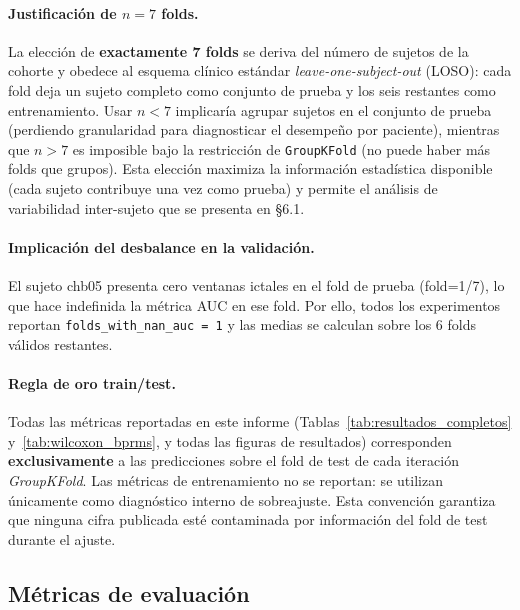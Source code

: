 \documentclass[12pt,a4paper]{article}
\begin{document}
\paragraph{Justificación de $n=7$ folds.}
La elección de \textbf{exactamente 7 folds} se deriva del número de sujetos de la cohorte
y obedece al esquema clínico estándar \textit{leave-one-subject-out} (LOSO): cada fold
deja un sujeto completo como conjunto de prueba y los seis restantes como entrenamiento.
Usar $n<7$ implicaría agrupar sujetos en el conjunto de prueba (perdiendo granularidad
para diagnosticar el desempeño por paciente), mientras que $n>7$ es imposible bajo la
restricción de \texttt{GroupKFold} (no puede haber más folds que grupos). Esta elección
maximiza la información estadística disponible (cada sujeto contribuye una vez como
prueba) y permite el análisis de variabilidad inter-sujeto que se presenta en §6.1.

\paragraph{Implicación del desbalance en la validación.}
El sujeto chb05 presenta cero ventanas ictales en el fold de prueba (fold=1/7), lo
que hace indefinida la métrica AUC en ese fold. Por ello, todos los experimentos
reportan \texttt{folds\_with\_nan\_auc = 1} y las medias se calculan sobre los
6 folds válidos restantes.

\paragraph{Regla de oro train/test.}
Todas las métricas reportadas en este informe
(Tablas~\ref{tab:resultados_completos} y~\ref{tab:wilcoxon_bprms}, y todas las
figuras de resultados) corresponden \textbf{exclusivamente} a las predicciones
sobre el fold de test de cada iteración \textit{GroupKFold}. Las métricas de
entrenamiento no se reportan: se utilizan únicamente como diagnóstico interno
de sobreajuste. Esta convención garantiza que ninguna cifra publicada esté
contaminada por información del fold de test durante el ajuste.

\subsection{Métricas de evaluación}
\end{document}
